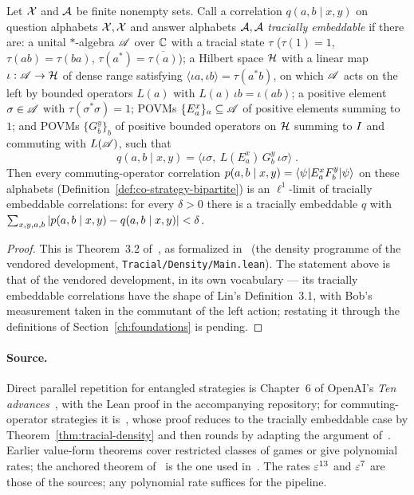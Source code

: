 \begin{theorem}
\label{thm:tracial-density}
\leanok
\qlib{}
Let $\mathcal{X}$ and $\mathcal{A}$ be finite nonempty sets. Call a correlation $q(a, b \mid x, y)$ on
question alphabets $\mathcal{X}, \mathcal{X}$ and answer alphabets $\mathcal{A}, \mathcal{A}$ \emph{tracially
embeddable} if there are: a unital $*$-algebra $\mathscr{A}$ over $\mathbb{C}$ with a tracial state
$\tau$ ($\tau(1) = 1$, $\tau(ab) = \tau(ba)$, $\tau(a^*) = \overline{\tau(a)}$); a
Hilbert space $\mathcal{H}$ with a linear map $\iota : \mathscr{A} \to \mathcal{H}$ of dense range satisfying
$\langle \iota a, \iota b \rangle = \tau(a^* b)$, on which $\mathscr{A}$ acts on the left by
bounded operators $L(a)$ with $L(a)\, \iota b = \iota(ab)$; a positive element $\sigma
\in \mathscr{A}$ with $\tau(\sigma^* \sigma) = 1$; POVMs $\{E^x_a\}_{a} \subseteq \mathscr{A}$ of
positive elements summing to $1$; and POVMs $\{G^y_b\}_{b}$ of positive bounded
operators on $\mathcal{H}$ summing to $I$ and commuting with $L(\mathscr{A})$, such that
\begin{equation*}
  q(a, b \mid x, y) = \bigl\langle \iota\sigma,\ L(E^x_a)\, G^y_b\, \iota\sigma \bigr\rangle\;.
\end{equation*}
Then every commuting-operator correlation $p(a, b \mid x, y) = \langle\psi| E^x_a F^y_b
|\psi\rangle$ on these alphabets (Definition~\ref{def:co-strategy-bipartite}) is an
$\ell^1$-limit of tracially embeddable correlations: for every $\delta > 0$ there is a
tracially embeddable $q$ with $\sum_{x, y, a, b} \left\vert {p(a, b \mid x, y) - q(a, b \mid
x, y)} \right\vert < \delta$.
\end{theorem}
\begin{proof}
\leanok
This is Theorem~3.2 of~\cite{Lin23}, as formalized in~\cite{Vid26} (the density
programme of the vendored development, \texttt{Tracial/Density/Main.lean}). The
statement above is that of the vendored development, in its own vocabulary --- its
tracially embeddable correlations have the shape of Lin's Definition~3.1, with Bob's
measurement taken in the commutant of the left action; restating it through the
definitions of Section~\ref{ch:foundations} is pending.
\end{proof}

\paragraph{Source.} Direct parallel repetition for entangled strategies is Chapter~6 of
OpenAI's \emph{Ten advances}~\cite{OpenAI26}, with the Lean proof in the accompanying
repository; for commuting-operator strategies it is~\cite{Vid26}, whose proof reduces
to the tracially embeddable case by Theorem~\ref{thm:tracial-density} and then rounds
by adapting the argument of~\cite{OpenAI26}. Earlier value-form theorems cover
restricted classes of games or give polynomial rates; the anchored theorem
of~\cite{BVY17} is the one used in~\cite{JNVWY20}.
The rates $\varepsilon^{13}$ and $\varepsilon^{7}$ are those of the sources; any polynomial rate
suffices for the pipeline.

